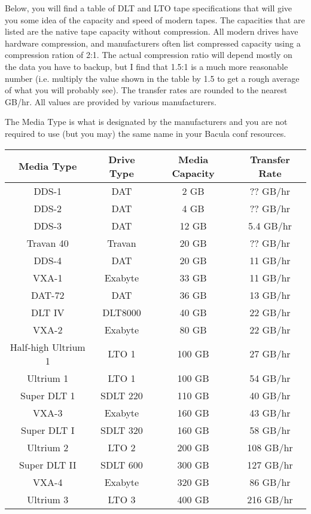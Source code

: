 Below, you will find a table of DLT and LTO tape specifications that will
give you some idea of the capacity and speed of modern tapes. The 
capacities that are listed are the native tape capacity without compression.
All modern drives have hardware compression, and manufacturers often list
compressed capacity using a compression ration of 2:1. The actual compression 
ratio will depend mostly on the data you have to backup, but I find that
1.5:1 is a much more reasonable number (i.e. multiply the value shown in 
the table by 1.5 to get a rough average of what you will probably see).
The transfer rates are rounded to the nearest GB/hr.  All values are provided
by various manufacturers.

The Media Type is what is designated by the manufacturers and you are not
required to use (but you may) the same name in your Bacula conf resources.


\begin{tabular}{|c|c|c|c}
Media Type      & Drive Type & Media Capacity & Transfer Rate \\ \hline
DDS-1              & DAT        & 2 GB &        ?? GB/hr   \\ \hline
DDS-2              & DAT        & 4 GB &        ?? GB/hr   \\ \hline
DDS-3              & DAT        & 12 GB &       5.4 GB/hr   \\ \hline
Travan 40          & Travan     & 20 GB &       ?? GB/hr    \\ \hline
DDS-4              & DAT        & 20 GB &       11 GB/hr    \\ \hline
VXA-1              & Exabyte    & 33 GB &       11 GB/hr    \\ \hline
DAT-72             & DAT        & 36 GB &       13 GB/hr    \\ \hline
DLT IV             & DLT8000    & 40 GB  &      22 GB/hr    \\ \hline
VXA-2              & Exabyte    & 80 GB &       22 GB/hr    \\ \hline
Half-high Ultrium 1 & LTO 1      & 100 GB &      27 GB/hr    \\ \hline
Ultrium 1          & LTO 1      & 100 GB &      54 GB/hr    \\ \hline
Super DLT 1        & SDLT 220   & 110 GB &      40 GB/hr    \\ \hline
VXA-3              & Exabyte    & 160 GB &      43 GB/hr    \\ \hline
Super DLT I        & SDLT 320   & 160 GB &      58 GB/hr    \\ \hline
Ultrium 2          & LTO 2      & 200 GB &      108 GB/hr   \\ \hline
Super DLT II       & SDLT 600   & 300 GB &      127 GB/hr   \\ \hline
VXA-4              & Exabyte    & 320 GB &      86 GB/hr    \\ \hline
Ultrium 3          & LTO 3      & 400 GB &      216 GB/hr   \\ \hline
\end{tabular}
